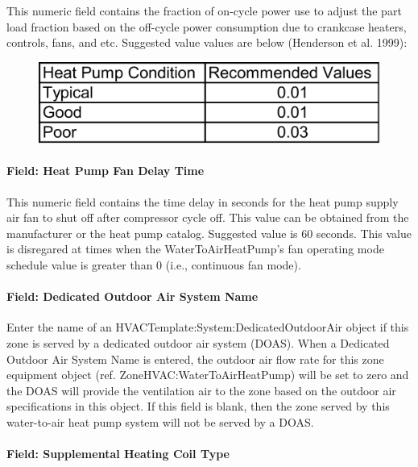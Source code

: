 This numeric field contains the fraction of on-cycle power use to adjust the part load fraction based on the off-cycle power consumption due to crankcase heaters, controls, fans, and etc. Suggested value values are below (Henderson et al. 1999):

\begin{figure}[htbp]
\centering
\includegraphics{media/image607.png}
\caption{}
\end{figure}

\paragraph{Field: Heat Pump Fan Delay Time}\label{field-heat-pump-fan-delay-time}

This numeric field contains the time delay in seconds for the heat pump supply air fan to shut off after compressor cycle off. This value can be obtained from the manufacturer or the heat pump catalog. Suggested value is 60 seconds. This value is disregared at times when the WaterToAirHeatPump's fan operating mode schedule value is greater than 0 (i.e., continuous fan mode).

\paragraph{Field: Dedicated Outdoor Air System Name}\label{field-dedicated-outdoor-air-system-name-4}

Enter the name of an HVACTemplate:System:DedicatedOutdoorAir object if this zone is served by a dedicated outdoor air system (DOAS). When a Dedicated Outdoor Air System Name is entered, the outdoor air flow rate for this zone equipment object (ref. ZoneHVAC:WaterToAirHeatPump) will be set to zero and the DOAS will provide the ventilation air to the zone based on the outdoor air specifications in this object. If this field is blank, then the zone served by this water-to-air heat pump system will not be served by a DOAS.

\paragraph{Field: Supplemental Heating Coil Type}\label{field-supplemental-heating-coil-type-1}


